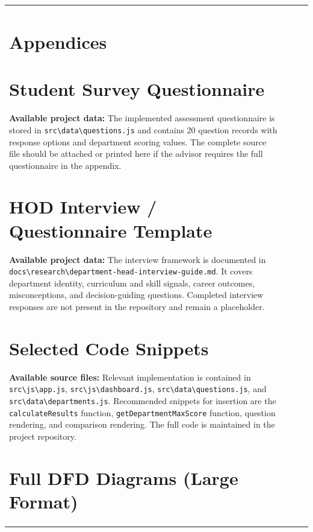 \documentclass[12pt, a4paper]{article}
\begin{document}
\begin{itemize}[leftmargin=1.5em, itemsep=3pt]
\begin{table}[H]
\begin{tabularx}{\textwidth}{>{\raggedright\arraybackslash}p{0.8cm}>{\raggedright\arraybackslash}p{3.5cm}>{\raggedright\arraybackslash}X>{\raggedright\arraybackslash}p{2.5cm}}
\section*{Appendices}
\addcontentsline{toc}{section}{Appendices}
\renewcommand{\thesection}{\Alph{section}}

\newpage
\section{Student Survey Questionnaire}
\label{appendix:survey}

\textbf{Available project data:} The implemented assessment questionnaire is stored in \texttt{src\textbackslash data\textbackslash questions.js} and contains 20 question records with response options and department scoring values. The complete source file should be attached or printed here if the advisor requires the full questionnaire in the appendix.

\newpage
\section{HOD Interview / Questionnaire Template}
\label{appendix:hod}

\textbf{Available project data:} The interview framework is documented in \texttt{docs\textbackslash research\textbackslash department-head-interview-guide.md}. It covers department identity, curriculum and skill signals, career outcomes, misconceptions, and decision-guiding questions. Completed interview responses are not present in the repository and remain a placeholder.

\newpage
\section{Selected Code Snippets}
\label{appendix:code}

\textbf{Available source files:} Relevant implementation is contained in \texttt{src\textbackslash js\textbackslash app.js}, \texttt{src\textbackslash js\textbackslash dashboard.js}, \texttt{src\textbackslash data\textbackslash questions.js}, and \texttt{src\textbackslash data\textbackslash departments.js}. Recommended snippets for insertion are the \texttt{calculateResults} function, \texttt{getDepartmentMaxScore} function, question rendering, and comparison rendering. The full code is maintained in the project repository.

\newpage
\section{Full DFD Diagrams (Large Format)}
\label{appendix:dfds}



\end{tabularx}
\end{table}
\end{itemize}
\end{document}
